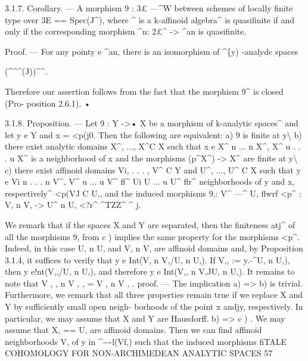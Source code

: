 \documentclass[
  10pt,
]{article}
\newenvironment{Shaded}{}{}
\newcommand{\NormalTok}[1]{#1}
\begin{document}
\begin{Shaded}
\begin{Highlighting}[]
\NormalTok{      3.1.7. Corollary. — A morphism 9 : 3£ —\^{}W between schemes of locally finite type over}
\NormalTok{3E == Spec(J\^{}), where \^{} is a k{-}affinoid algebra\^{} is quasifinite if and only if the corresponding}
\NormalTok{morphism \^{}n: 2£\^{} {-}\textgreater{} \^{}an is quasifinite.}

\NormalTok{      Proof. — For any pointy e \^{}an, there is an isomorphism of \^{}\{y) {-}analydc spaces}

\NormalTok{                  (\^{}\^{}\^{}(J))\^{}\^{}.}

\NormalTok{Therefore our assertion follows from the fact that the morphism 9\^{} is closed (Pro{-}}
\NormalTok{position 2.6.1). •}

\NormalTok{     3.1.8. Proposition. — Let 9 : Y {-}\textgreater{}• X be a morphism of k{-}analytic spaces\^{} and let y e Y}
\NormalTok{and x = \textless{}p(j0. Then the following are equivalent:}
\NormalTok{       a) 9 is finite at y\textbackslash{}}
\NormalTok{       b) there exist analytic domains X\^{}, ..., X\^{}C X such that x e X\^{} n ... n X\^{},}
\NormalTok{X\^{} u . . . u X\^{} is a neighborhood of x and the morphisms (p\textquotesingle{}\^{}X\^{}) {-}\textgreater{} X\^{} are finite at y\textbackslash{}}
\NormalTok{       c) there exist affinoid domains Vi, . . . , V\^{} C Y and U\^{}, ..., U\^{} C X such that}
\NormalTok{y e Vi n . . . n V\^{}, V\^{} u ... u V\^{} fl\^{} Ui U ... u U\^{} flr\^{} neighborhoods of y and x,}
\NormalTok{respectively\^{} \textless{}p(VJ C U,, and the induced morphisms 9,: V\^{} —\^{} U, flwrf \textless{}p\^{} : V, n V, {-}\textgreater{} U\^{} n U,}
\NormalTok{\textless{}?r\^{} \^{}TZZ\^{} \^{} j.}

\NormalTok{      We remark that if the spaces X and Y are separated, then the finiteness atj\^{} of}
\NormalTok{all the morphisms 9, from c ) implies the same property for the morphisms \textless{}p\^{}. Indeed,}
\NormalTok{in this case U, n U, and V, n V, are affinoid domains and, by Proposition 3.1.4,}
\NormalTok{it suffices to verify that y e Int(V, n V,/U, n U,). If V,, := y.{-}\^{}U, n U,), then}
\NormalTok{y e!nt(V,,/U, n U,), and therefore y e Int(V,, n V,JU, n U,). It remains to note}
\NormalTok{that V , , n V , , = V , n V , .}
\NormalTok{       proof. — The implication a) =\textgreater{} b) is trivial. Furthermore, we remark that all}
\NormalTok{ three properties remain true if we replace X and Y by sufficiently small open neigh{-}}
\NormalTok{ borhoods of the point x andjy, respectively. In particular, we may assume that X and Y}
\NormalTok{ are Hausdorff.}
\NormalTok{       b) =\textgreater{} c ) . We may assume that X, == U,\textquotesingle{} are affinoid domains. Then we can}
\NormalTok{ find affinoid neighborhoods V,\textquotesingle{} of y in \^{}\textasciitilde{}\textasciitilde{}l(Vf,) such that the induced morphisms}
\NormalTok{            fiTALE COHOMOLOGY FOR NON{-}ARCHIMEDEAN ANALYTIC SPACES                             57}


\end{Highlighting}
\end{Shaded}
\end{document}
